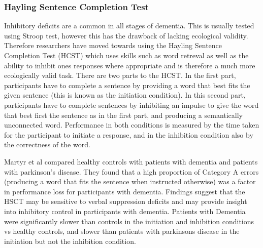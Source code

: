 \documentclass{article}
\begin{document}
\subsubsection{Hayling Sentence Completion Test}
Inhibitory deficits are a common in all stages of dementia. This is usually tested using Stroop test, however this has the drawback of lacking ecological validity. Therefore researchers have moved towards using the Hayling Sentence Completion Test (HCST) which uses skills such as word retreval as well as the ability to inhibit ones responses where appropriate and is therefore a much more ecologically valid task. There are two parts to the HCST. In the first part, participants have to complete a sentence by providing a word that best fits the given sentence (this is known as the initiation condition). In this second part, participants have to complete sentences by inhibiting an impulse to give the word that best first the sentence as in the first part, and producing a semantically unconnected word. Performance in both conditions is measured by the time taken for the participant to initiate a response, and in the inhibition condition also by the correctness of the word.   
\par 
Martyr et al compared healthy controls with patients with dementia and patients with parkinson's disease. They found that a high proportion of Category A errors (producing a word that fits the sentence when instructed otherwise) was a factor in performance loss for participants with dementia. Findings suggest that the HSCT may be sensitive to verbal suppression deficits and may provide insight into inhibitory control in participants with dementia. Patients with Dementia were significantly slower than controls in the initiation and inhibition conditions vs healthy controls, and slower than patients with parkinsons disease in the initiation but not the inhibition condition.
\end{document}
